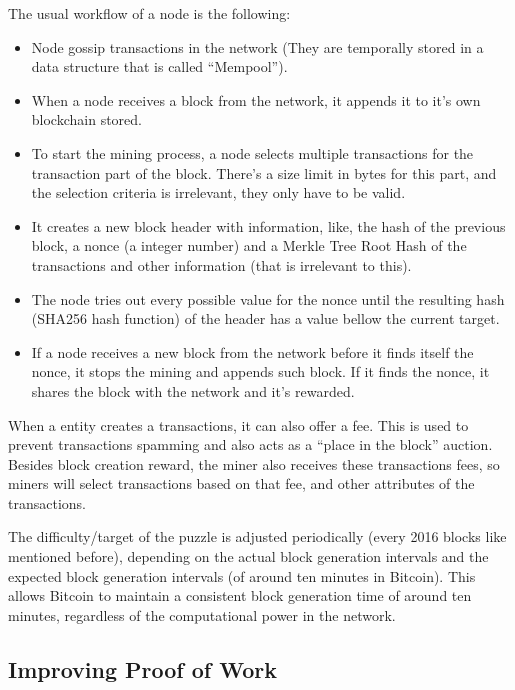 The usual workflow of a node is the following:
\begin{itemize}
    \item Node gossip transactions in the network (They are temporally stored in a data structure that is called ``Mempool'').
    \item When a node receives a block from the network, it appends it to it's own blockchain stored.
    \item To start the mining process, a node selects multiple transactions for the transaction part of the block. There's a size limit in bytes for this part, and the selection criteria is irrelevant, they only have to be valid.
    \item It creates a new block header with information, like, the hash of the previous block, a nonce (a integer number) and a Merkle Tree Root Hash of the transactions and other information (that is irrelevant to this).
    \item The node tries out every possible value for the nonce until the resulting hash (SHA256 hash function) of the header has a value bellow the current target.
    \item If a node receives a new block from the network before it finds itself the nonce, it stops the mining and appends such block. If it finds the nonce, it shares the block with the network and it's rewarded.
    
\end{itemize}

When a entity creates a transactions, it can also offer a fee. This is used to prevent transactions spamming and also acts as a ``place in the block'' auction.
Besides block creation reward, the miner also receives these transactions fees, so miners will select transactions based on that fee, and other attributes of the transactions.

The difficulty/target of the puzzle is adjusted periodically (every 2016 blocks like mentioned before), depending on the actual block generation intervals and the expected block generation intervals (of around ten minutes in Bitcoin). 
This allows Bitcoin to maintain a consistent block generation time of around ten minutes, regardless of the computational power in the network.

\subsection*{Improving Proof of Work}

